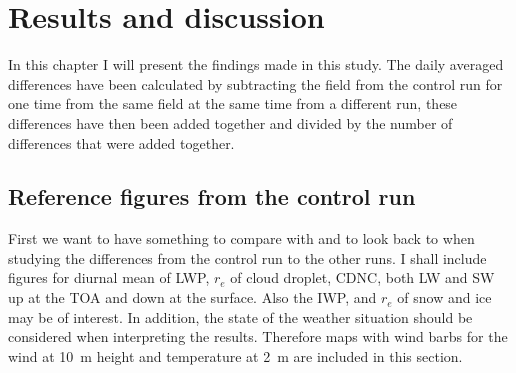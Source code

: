 \chapter{Results and discussion}
\label{chap:results}
In this chapter I will present the findings made in this study.  The daily averaged differences have been calculated by subtracting the field from the control run for one time from the same field at the same time from a different run, these differences have then been added together and divided by the number of differences that were added together.

\section{Reference figures from the control run}
First we want to have something to compare with and to look back to when studying the differences from the control run to the other runs. I shall include figures for diurnal mean of LWP, $r_e$ of cloud droplet, CDNC, both LW and SW up at the TOA and down at the surface. Also the IWP, and $r_e$ of snow and ice may be of interest. In addition, the state of the weather situation should be considered when interpreting the results. Therefore maps with wind barbs for the wind at 10~m height and temperature at 2~m are included in this section.

